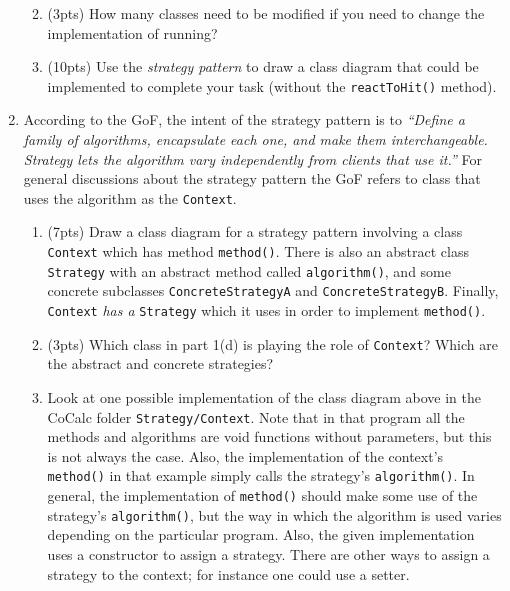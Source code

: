 \documentclass[11pt]{article}
\begin{document}
\begin{enumerate}
\begin{enumerate}
    \vspace{0.5in}

    \item (3pts) How many classes need to be modified if you need to change the implementation of running?

    \vspace{0.5in}


    \item (10pts) Use the \emph{strategy pattern} to draw a class diagram that could be implemented to  complete your task (without the \texttt{reactToHit()} method).

    \vfill

  \end{enumerate}

\newpage

  \item According to the GoF, the intent of the strategy pattern is to \emph{``Define a family of algorithms, encapsulate each one, and make them interchangeable. Strategy lets the algorithm vary independently from clients that use it.''} For general discussions about the strategy pattern the GoF refers to class that uses the algorithm as the \texttt{Context}.

  \begin{enumerate}

    \item (7pts) Draw a class diagram for a strategy pattern involving a class \texttt{Context} which has method \texttt{method()}. There is also an abstract class \texttt{Strategy} with an abstract method called \texttt{algorithm()}, and some concrete subclasses \texttt{ConcreteStrategyA} and \texttt{ConcreteStrategyB}. Finally, \texttt{Context} \emph{has a} \texttt{Strategy} which it uses in order to implement \texttt{method()}. 

    \vfill

    \item (3pts) Which class in part 1(d) is playing the role of \texttt{Context}? Which are the abstract and concrete strategies?

    \vspace{1in}

    \item Look at one possible implementation of the class diagram above in the CoCalc folder \texttt{Strategy/Context}. Note that in that program all the methods and algorithms are void functions without parameters, but this is not always the case. Also, the implementation of the context's \texttt{method()} in that example simply calls the strategy's \texttt{algorithm()}. In general, the implementation of \texttt{method()} should make some use of the strategy's \texttt{algorithm()}, but the way in which the algorithm is used varies depending on the particular program. Also, the given implementation uses a constructor to assign a strategy. There are other ways to assign a strategy to the context; for instance one could use a setter.


\end{enumerate}
\end{enumerate}
\end{document}
